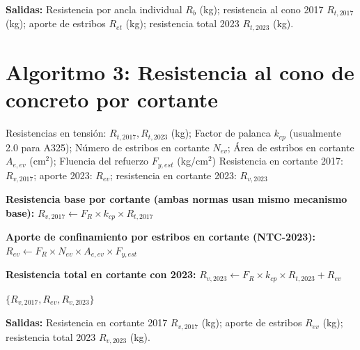 \textbf{Salidas:} Resistencia por ancla individual $R_b$ (kg); resistencia al cono 2017
$R_{t,2017}$ (kg); aporte de estribos $R_{et}$ (kg); resistencia total 2023 $R_{t,2023}$ (kg).

\section{Algoritmo 3: Resistencia al cono de concreto por cortante}

\begin{algorithm}[H]
  \caption{\textbf{resistencia\_cortante\_cono}$(R_{t,2017}, R_{t,2023}, k_{cp},
           N_{ev}, A_{e,ev}, F_{y,est})$}
  \label{alg:cortante_cono}
  \begin{algorithmic}[1]
    \Require Resistencias en tensión: $R_{t,2017}, R_{t,2023}$ (kg);
             Factor de palanca $k_{cp}$ (usualmente 2.0 para A325);
             Número de estribos en cortante $N_{ev}$;
             Área de estribos en cortante $A_{e,ev}$ (cm$^2$);
             Fluencia del refuerzo $F_{y,est}$ (kg/cm$^2$)
    \Ensure Resistencia en cortante 2017: $R_{v,2017}$; aporte 2023: $R_{ev}$;
            resistencia en cortante 2023: $R_{v,2023}$

    \State \textbf{Resistencia base por cortante (ambas normas usan mismo mecanismo base):}
    \State $R_{v,2017} \gets F_R \times k_{cp} \times R_{t,2017}$
      \quad {}

    \State \textbf{Aporte de confinamiento por estribos en cortante (NTC-2023):}
    \State $R_{ev} \gets F_R \times N_{ev} \times A_{e,ev} \times F_{y,est}$
      \quad {}

    \State \textbf{Resistencia total en cortante con 2023:}
    \State $R_{v,2023} \gets F_R \times k_{cp} \times R_{t,2023} + R_{ev}$

    \Return $\{R_{v,2017}, R_{ev}, R_{v,2023}\}$
  \end{algorithmic}
\end{algorithm}

\textbf{Salidas:} Resistencia en cortante 2017 $R_{v,2017}$ (kg); aporte de estribos
$R_{ev}$ (kg); resistencia total 2023 $R_{v,2023}$ (kg).


